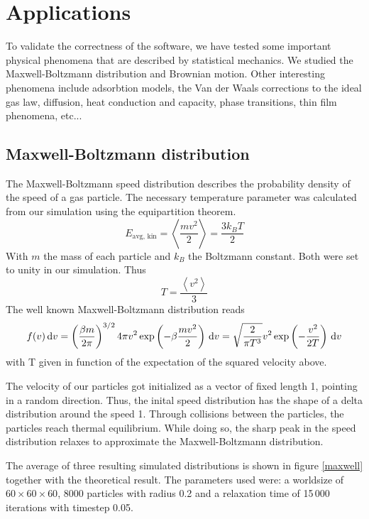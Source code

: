 \section{Applications}

To validate the correctness of the software, we have tested some important 
physical phenomena that are described by statistical mechanics. We studied 
the Maxwell-Boltzmann distribution and Brownian motion. Other interesting 
phenomena include adsorbtion models, the Van der Waals corrections to the 
ideal gas law, diffusion, heat conduction and capacity, phase transitions, 
thin film phenomena, etc...

\subsection{Maxwell-Boltzmann distribution}
The Maxwell-Boltzmann speed distribution describes the probability density of 
the speed of a gas particle. The necessary temperature parameter was calculated 
from our simulation using the equipartition theorem.
$$
E_{\textrm{avg, kin}} = \left< \frac{mv^2}{2} \right> = \frac{3k_BT}{2}
$$
With $m$ the mass of each particle and $k_B$ the Boltzmann constant. Both were 
set to unity in our simulation. Thus
$$
T = \frac{\left< v^2 \right>}{3}
$$
The well known Maxwell-Boltzmann distribution reads \cite{maxwellDist}
$$
f(v)\,\mathrm d v = \left( \frac{\beta m}{2 \pi} \right)^{3/2} 4 \pi v^2
\exp\left( -\beta \frac{mv^2}{2}\right) \,\mathrm d v =
\sqrt{ \frac{2}{\pi T^3} } v^2 \exp \left(-\frac{v^2}{2T}\right) \,\mathrm d v
$$
with T given in function of the expectation of the squared velocity above.

The velocity of our particles got initialized as a vector of fixed length 
1, pointing in a random direction. Thus, the inital speed distribution has 
the shape of a delta distribution around the speed 1. Through collisions 
between the particles, the particles reach thermal equilibrium. While doing 
so, the sharp peak in the speed distribution relaxes to approximate the 
Maxwell-Boltzmann distribution.


The average of three  resulting simulated distributions is shown in figure 
\ref{maxwell} together with the theoretical result. The parameters used 
were: a worldsize of $60 \times 60 \times 60$, 8000 particles with radius 
0.2 and a relaxation time of 15\,000 iterations with timestep 0.05.

